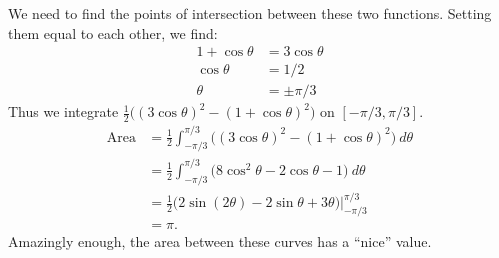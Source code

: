 \enlargethispage{2\baselineskip}
{We need to find the points of intersection between these two functions. Setting them equal to each other, we find:
\begin{align*}
1+\cos\theta &= 3\cos \theta \\
 \cos\theta &=1/2\\
\theta &= \pm \pi/3
\end{align*}
Thus we integrate $\frac12\big((3\cos\theta)^2-(1+\cos\theta)^2\big)$ on $[-\pi/3,\pi/3]$.
\begin{align*}
\text{Area} &= \frac12\int_{-\pi/3}^{\pi/3} \big((3\cos\theta)^2-(1+\cos\theta)^2\big)\ d\theta\\
		&= \frac12\int_{-\pi/3}^{\pi/3} \big( 8\cos^2\theta-2\cos\theta-1\big)\ d\theta \\
		&= \frac12\big(2\sin(2\theta) - 2\sin\theta+3\theta\big)\Bigg|_{-\pi/3}^{\pi/3}\\
		&= \pi.
\end{align*}
Amazingly enough, the area between these curves has a ``nice'' value.
}\\

